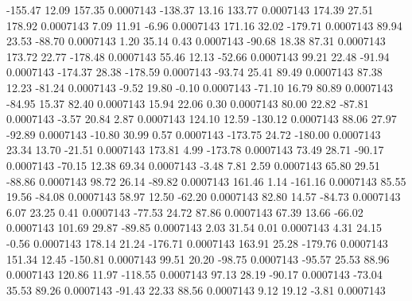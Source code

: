      -155.47       12.09      157.35     0.0007143
     -138.37       13.16      133.77     0.0007143
      174.39       27.51      178.92     0.0007143
        7.09       11.91       -6.96     0.0007143
      171.16       32.02     -179.71     0.0007143
       89.94       23.53      -88.70     0.0007143
        1.20       35.14        0.43     0.0007143
      -90.68       18.38       87.31     0.0007143
      173.72       22.77     -178.48     0.0007143
       55.46       12.13      -52.66     0.0007143
       99.21       22.48      -91.94     0.0007143
     -174.37       28.38     -178.59     0.0007143
      -93.74       25.41       89.49     0.0007143
       87.38       12.23      -81.24     0.0007143
       -9.52       19.80       -0.10     0.0007143
      -71.10       16.79       80.89     0.0007143
      -84.95       15.37       82.40     0.0007143
       15.94       22.06        0.30     0.0007143
       80.00       22.82      -87.81     0.0007143
       -3.57       20.84        2.87     0.0007143
      124.10       12.59     -130.12     0.0007143
       88.06       27.97      -92.89     0.0007143
      -10.80       30.99        0.57     0.0007143
     -173.75       24.72     -180.00     0.0007143
       23.34       13.70      -21.51     0.0007143
      173.81        4.99     -173.78     0.0007143
       73.49       28.71      -90.17     0.0007143
      -70.15       12.38       69.34     0.0007143
       -3.48        7.81        2.59     0.0007143
       65.80       29.51      -88.86     0.0007143
       98.72       26.14      -89.82     0.0007143
      161.46        1.14     -161.16     0.0007143
       85.55       19.56      -84.08     0.0007143
       58.97       12.50      -62.20     0.0007143
       82.80       14.57      -84.73     0.0007143
        6.07       23.25        0.41     0.0007143
      -77.53       24.72       87.86     0.0007143
       67.39       13.66      -66.02     0.0007143
      101.69       29.87      -89.85     0.0007143
        2.03       31.54        0.01     0.0007143
        4.31       24.15       -0.56     0.0007143
      178.14       21.24     -176.71     0.0007143
      163.91       25.28     -179.76     0.0007143
      151.34       12.45     -150.81     0.0007143
       99.51       20.20      -98.75     0.0007143
      -95.57       25.53       88.96     0.0007143
      120.86       11.97     -118.55     0.0007143
       97.13       28.19      -90.17     0.0007143
      -73.04       35.53       89.26     0.0007143
      -91.43       22.33       88.56     0.0007143
        9.12       19.12       -3.81     0.0007143
